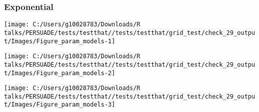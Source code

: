 \documentclass[
]{article}
\begin{document}
\clearpage

\begin{table}[H]
\centering
\caption{\label{tab:Table_2}Goodness of fit statistics}
\centering
{}
\end{table}

\clearpage

\clearpage

\subsubsection{Exponential}\label{exponential}

\begin{flushleft}\texttt{[image: C:/Users/g10028783/Downloads/R talks/PERSUADE/tests/testthat//tests/testthat/grid\_test/check\_29\_output/Images/Figure\_param\_models-1]} \end{flushleft}

\begin{flushleft}\texttt{[image: C:/Users/g10028783/Downloads/R talks/PERSUADE/tests/testthat//tests/testthat/grid\_test/check\_29\_output/Images/Figure\_param\_models-2]} \end{flushleft}

\begin{flushleft}\texttt{[image: C:/Users/g10028783/Downloads/R talks/PERSUADE/tests/testthat//tests/testthat/grid\_test/check\_29\_output/Images/Figure\_param\_models-3]} \end{flushleft}
\end{document}
